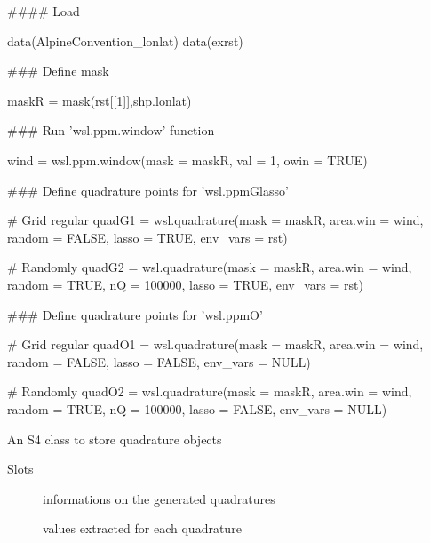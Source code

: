 \documentclass[a4paper]{book}
\begin{document}
%
\begin{Examples}
\begin{ExampleCode}

#### Load

data(AlpineConvention_lonlat)
data(exrst)

### Define mask

maskR = mask(rst[[1]],shp.lonlat)

### Run 'wsl.ppm.window' function

wind = wsl.ppm.window(mask = maskR,
                      val = 1,
                      owin = TRUE)

### Define quadrature points for 'wsl.ppmGlasso'

   # Grid regular
quadG1 = wsl.quadrature(mask = maskR,
                        area.win = wind,
                        random = FALSE,
                        lasso = TRUE,
                        env_vars = rst)

   # Randomly
quadG2 = wsl.quadrature(mask = maskR,
                        area.win = wind,
                        random = TRUE,
                        nQ = 100000,
                        lasso = TRUE,
                        env_vars = rst)

### Define quadrature points for 'wsl.ppmO'

   # Grid regular
quadO1 = wsl.quadrature(mask = maskR,
                        area.win = wind,
                        random = FALSE,
                        lasso = FALSE,
                        env_vars = NULL)

   # Randomly
quadO2 = wsl.quadrature(mask = maskR,
                        area.win = wind,
                        random = TRUE,
                        nQ = 100000,
                        lasso = FALSE,
                        env_vars = NULL)

\end{ExampleCode}
\end{Examples}
%
\begin{Description}\relax
An S4 class to store quadrature  objects
\end{Description}
%
\begin{Section}{Slots}

\begin{description}

\item[] informations on the generated quadratures

\item[] values extracted for each quadrature

\end{description}
\end{Section}
\end{document}
